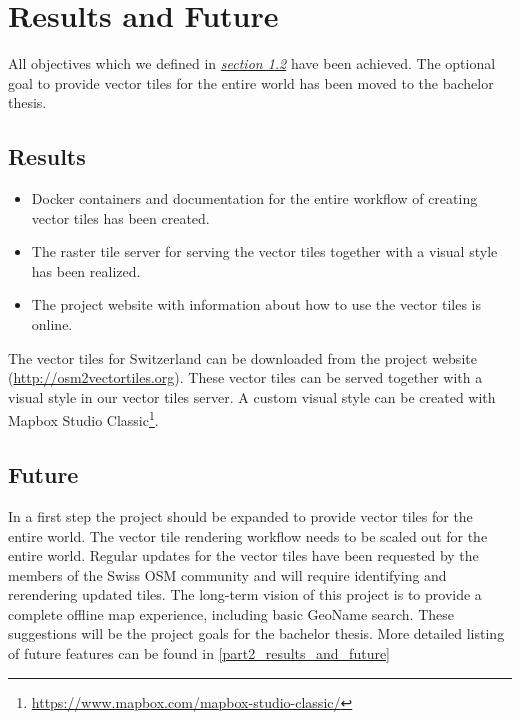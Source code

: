 \chapter{Results and Future}\label{part1_results_and_future}

All objectives which we defined in \hyperref[targets]{\emph{section 1.2}} have been achieved. The optional goal to provide vector tiles for the entire world has been moved to the bachelor thesis.

\section{Results}\label{part1_results}

\begin{itemize}
\item
  Docker containers and documentation for the entire workflow of creating vector tiles has been created.
\item
  The raster tile server for serving the vector tiles together with a visual style has been realized.
\item
  The project website with information about how to use the vector tiles is online.
\end{itemize}
\newline{}
The vector tiles for Switzerland can be downloaded from the project website (\url{http://osm2vectortiles.org}). These vector tiles can be served together with a visual style in our vector tiles server.
\newline{}
A custom visual style can be created with Mapbox Studio Classic\footnote{\url{https://www.mapbox.com/mapbox-studio-classic/}}.

\section{Future}\label{part1_future}
In a first step the project should be expanded to provide vector tiles for the entire world.
The vector tile rendering workflow needs to be scaled out for the entire world.
\newline{}
Regular updates for the vector tiles have been requested by the members of the Swiss OSM community
and will require identifying and rerendering updated tiles.
\newline{}
The long-term vision of this project is to provide a complete offline map experience, including basic GeoName search.
\newline{}
These suggestions will be the project goals for the bachelor thesis. More detailed listing of
future features can be found in \autoref{part2_results_and_future}
